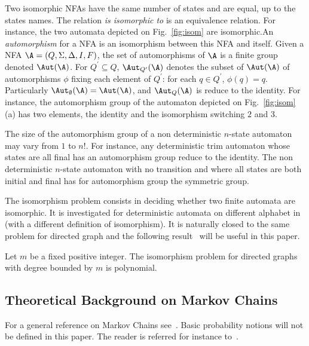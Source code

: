 Two isomorphic NFAs have the same number of states and are equal, up to
 the states names. The relation {\it is isomorphic to} is an equivalence relation.
For instance, the two automata depicted on Fig.~\ref{fig:isom} are
isomorphic.An {\it automorphism} for a NFA is an isomorphism between this NFA and
itself. 
Given a NFA $\A=(Q,\Sigma,\Delta,I,F)$, the set of automorphisms of $\A$ is
a finite group denoted $\Aut(\A)$. For $Q^\prime\subseteq Q$, 
$\Aut_{Q^\prime}(\A)$ denotes the subset of  $\Aut(\A)$ of automorphisms $\phi$
fixing each element of $Q^\prime$:  for each $q\in Q^\prime$, $\phi(q)=q$.
Particularly $\Aut_{\emptyset}(\A)=\Aut(\A)$, and  
$\Aut_{Q}(\A)$ is reduce to the identity.
For instance, the  automorphism group of the 
automaton depicted on Fig.~\ref{fig:isom}(a) has two elements, the identity
and the isomorphism switching $2$ and $3$. 


The size of the automorphism group of a non deterministic $n$-state
automaton may vary from $1$ to $n!$. For instance, any deterministic trim
automaton whose states are all final has an  automorphism group reduce to
the identity. The non deterministic $n$-state automaton with no transition
and where all states are both initial and final has for automorphism group
the symmetric group. 

The isomorphism problem consists in deciding whether two finite automata are
isomorphic. It is investigated for deterministic automata on different alphabet
in~\cite{DBLP:journals/siamcomp/Booth78} (with a different definition of
isomorphism). It is naturally closed to the same problem for directed graph
and the following result~\cite{DBLP:journals/jcss/Luks82} will be useful in
this paper.
\begin{theorem}\label{thm:luks}
Let $m$ be a fixed positive integer. The isomorphism problem for directed
graphs with degree bounded by $m$ is polynomial.
\end{theorem}

\subsection{Theoretical Background on Markov Chains}\label{sec:theoryMC}

For a general reference on Markov Chains see~\cite{mixing}. Basic
probability notions will not be defined in this paper. The reader is
referred for instance to~\cite{proba-and-computing}.

